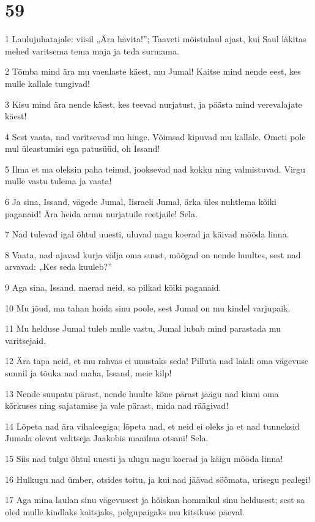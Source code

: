 \chapter{59}

\par 1 Laulujuhatajale: viisil „Ära hävita!”; Taaveti mõistulaul ajast, kui Saul läkitas mehed varitsema tema maja ja teda surmama.
\par 2 Tõmba mind ära mu vaenlaste käest, mu Jumal! Kaitse mind nende eest, kes mulle kallale tungivad!
\par 3 Kisu mind ära nende käest, kes teevad nurjatust, ja päästa mind verevalajate käest!
\par 4 Sest vaata, nad varitsevad mu hinge. Võimsad kipuvad mu kallale. Ometi pole mul üleastumisi ega patusüüd, oh Issand!
\par 5 Ilma et ma oleksin paha teinud, jooksevad nad kokku ning valmistuvad. Virgu mulle vastu tulema ja vaata!
\par 6 Ja sina, Issand, vägede Jumal, Iisraeli Jumal, ärka üles nuhtlema kõiki paganaid! Ära heida armu nurjatuile reetjaile! Sela.
\par 7 Nad tulevad igal õhtul uuesti, uluvad nagu koerad ja käivad mööda linna.
\par 8 Vaata, nad ajavad kurja välja oma suust, mõõgad on nende huultes, sest nad arvavad: „Kes seda kuuleb?”
\par 9 Aga sina, Issand, naerad neid, sa pilkad kõiki paganaid.
\par 10 Mu jõud, ma tahan hoida sinu poole, sest Jumal on mu kindel varjupaik.
\par 11 Mu helduse Jumal tuleb mulle vastu, Jumal lubab mind parastada mu varitsejaid.
\par 12 Ära tapa neid, et mu rahvas ei unustaks seda! Pilluta nad laiali oma vägevuse sunnil ja tõuka nad maha, Issand, meie kilp!
\par 13 Nende suupatu pärast, nende huulte kõne pärast jäägu nad kinni oma kõrkuses ning sajatamise ja vale pärast, mida nad räägivad!
\par 14 Lõpeta nad ära vihaleegiga; lõpeta nad, et neid ei oleks ja et nad tunneksid Jumala olevat valitseja Jaakobis maailma otsani! Sela.
\par 15 Siis nad tulgu õhtul uuesti ja ulugu nagu koerad ja käigu mööda linna!
\par 16 Hulkugu nad ümber, otsides toitu, ja kui nad jäävad söömata, urisegu pealegi!
\par 17 Aga mina laulan sinu vägevusest ja hõiskan hommikul sinu heldusest; sest sa oled mulle kindlaks kaitsjaks, pelgupaigaks mu kitsikuse päeval.

